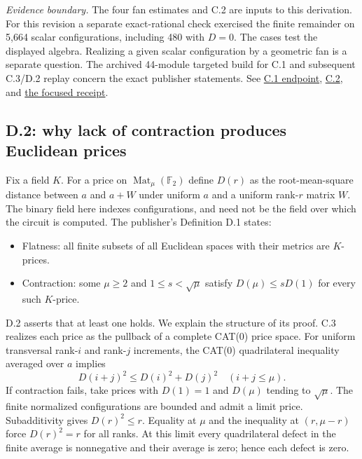 \documentclass[11pt,letterpaper]{article}
\theoremstyle{definition}\newtheorem{definition}[theorem]{Definition}\newtheorem{example}[theorem]{Example}
\theoremstyle{remark}\newtheorem{remark}[theorem]{Remark}
\newcommand{\F}{\mathbb{F}}
\newcommand{\pub}[3]{\href{https://github.com/anthropics/formal-math/blob/11b6c7e3c927df2658f513b6b68ea7f8929c62c5/vp-vnp/#1\#L#2}{#3}}
\newcommand{\aud}[2]{\href{https://github.com/nousentllc/VP-VNP-Review/blob/567303d0bcf4f9d54390437b137752446e58ccd6/#1}{#2}}
\newcommand{\scope}[1]{\par\smallskip\noindent\textit{Evidence boundary.} #1\par\smallskip}
\begin{document}
\scope{The four fan estimates and C.2 are inputs to this derivation. For this revision a separate exact-rational check exercised the finite remainder on 5,664 scalar configurations, including 480 with $D=0$. The cases test the displayed algebra. Realizing a given scalar configuration by a geometric fan is a separate question. The archived 44-module targeted build for C.1 and subsequent C.3/D.2 replay concern the exact publisher statements. See \pub{Paper/Fan.lean}{987}{C.1 endpoint}, \pub{Paper/Means.lean}{465}{C.2}, and \aud{checks/pass09_endpoint_replay_results.json}{the focused receipt}.}

\subsection{D.2: why lack of contraction produces Euclidean prices}\label{sec:d2}
Fix a field $K$. For a price on $\operatorname{Mat}_\mu(\F_2)$ define $D(r)$ as the root-mean-square distance between $a$ and $a+W$ under uniform $a$ and a uniform rank-$r$ matrix $W$. The binary field here indexes configurations, and need not be the field over which the circuit is computed. The publisher's Definition D.1 states:
\begin{itemize}[leftmargin=1.5em,itemsep=1pt]
\item Flatness: all finite subsets of all Euclidean spaces with their metrics are $K$-prices.
\item Contraction: some $\mu\ge2$ and $1\le s<\sqrt\mu$ satisfy $D(\mu)\le sD(1)$ for every such $K$-price.
\end{itemize}
D.2 asserts that at least one holds. We explain the structure of its proof. C.3 realizes each price as the pullback of a complete CAT(0) price space. For uniform transversal rank-$i$ and rank-$j$ increments, the CAT(0) quadrilateral inequality averaged over $a$ implies
\[
 D(i+j)^2\le D(i)^2+D(j)^2 \quad (i+j\le\mu).
\]
If contraction fails, take prices with $D(1)=1$ and $D(\mu)$ tending to $\sqrt\mu$. The finite normalized configurations are bounded and admit a limit price. Subadditivity gives $D(r)^2\le r$. Equality at $\mu$ and the inequality at $(r,\mu-r)$ force $D(r)^2=r$ for all ranks. At this limit every quadrilateral defect in the finite average is nonnegative and their average is zero; hence each defect is zero.
\end{document}
